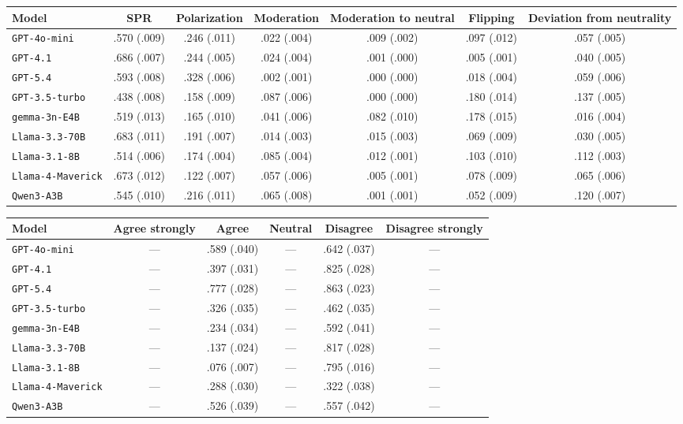 \begin{tabular}{lcccccc}
		\\
		\hline
		Model & SPR & Polarization & Moderation & Moderation to neutral & Flipping & Deviation from neutrality \\
		\hline
		\texttt{GPT-4o-mini} & .570 (.009) & .246 (.011) & .022 (.004) & .009 (.002) & .097 (.012) & .057 (.005) \\
		\texttt{GPT-4.1} & .686 (.007) & .244 (.005) & .024 (.004) & .001 (.000) & .005 (.001) & .040 (.005) \\
		\texttt{GPT-5.4} & .593 (.008) & .328 (.006) & .002 (.001) & .000 (.000) & .018 (.004) & .059 (.006) \\
		\texttt{GPT-3.5-turbo} & .438 (.008) & .158 (.009) & .087 (.006) & .000 (.000) & .180 (.014) & .137 (.005) \\
		\texttt{gemma-3n-E4B} & .519 (.013) & .165 (.010) & .041 (.006) & .082 (.010) & .178 (.015) & .016 (.004) \\
		\texttt{Llama-3.3-70B} & .683 (.011) & .191 (.007) & .014 (.003) & .015 (.003) & .069 (.009) & .030 (.005) \\
		\texttt{Llama-3.1-8B} & .514 (.006) & .174 (.004) & .085 (.004) & .012 (.001) & .103 (.010) & .112 (.003) \\
		\texttt{Llama-4-Maverick} & .673 (.012) & .122 (.007) & .057 (.006) & .005 (.001) & .078 (.009) & .065 (.006) \\
		\texttt{Qwen3-A3B} & .545 (.010) & .216 (.011) & .065 (.008) & .001 (.001) & .052 (.009) & .120 (.007) \\
		\hline
\end{tabular}


\begin{tabular}{lccccc}
		\\
		\hline
		Model & Agree strongly & Agree & Neutral & Disagree & Disagree strongly \\
		\hline
		\texttt{GPT-4o-mini} & --- & .589 (.040) & --- & .642 (.037) & --- \\
		\texttt{GPT-4.1} & --- & .397 (.031) & --- & .825 (.028) & --- \\
		\texttt{GPT-5.4} & --- & .777 (.028) & --- & .863 (.023) & --- \\
		\texttt{GPT-3.5-turbo} & --- & .326 (.035) & --- & .462 (.035) & --- \\
		\texttt{gemma-3n-E4B} & --- & .234 (.034) & --- & .592 (.041) & --- \\
		\texttt{Llama-3.3-70B} & --- & .137 (.024) & --- & .817 (.028) & --- \\
		\texttt{Llama-3.1-8B} & --- & .076 (.007) & --- & .795 (.016) & --- \\
		\texttt{Llama-4-Maverick} & --- & .288 (.030) & --- & .322 (.038) & --- \\
		\texttt{Qwen3-A3B} & --- & .526 (.039) & --- & .557 (.042) & --- \\
		\hline
\end{tabular}


